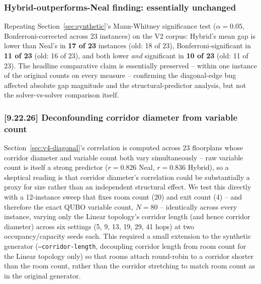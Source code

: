 \documentclass[11pt]{article}
\begin{document}
\subsubsection{Hybrid-outperforms-Neal finding: essentially unchanged}

Repeating Section~\ref{sec:synthetic}'s Mann-Whitney significance test ($\alpha=0.05$, Bonferroni-corrected across 23 instances) on the V2 corpus: Hybrid's mean gap is lower than Neal's in \textbf{17 of 23} instances (old: 18 of 23), Bonferroni-significant in \textbf{11 of 23} (old: 16 of 23), and both lower \emph{and} significant in \textbf{10 of 23} (old: 11 of 23). The headline comparative claim is essentially preserved -- within one instance of the original counts on every measure -- confirming the diagonal-edge bug affected absolute gap magnitude and the structural-predictor analysis, but not the solver-vs-solver comparison itself.

\subsubsection{[9.22.26] Deconfounding corridor diameter from variable count}
\label{sec:dsweep}

Section~\ref{sec:v4-diagonal}'s correlation is computed across 23 floorplans whose corridor diameter and variable count both vary simultaneously -- raw variable count is itself a strong predictor ($r=0.826$ Neal, $r=0.836$ Hybrid), so a skeptical reading is that corridor diameter's correlation could be substantially a proxy for size rather than an independent structural effect. We test this directly with a 12-instance sweep that fixes room count (20) and exit count (4) -- and therefore the exact QUBO variable count, $N=80$ -- identically across every instance, varying only the Linear topology's corridor length (and hence corridor diameter) across six settings (5, 9, 13, 19, 29, 41 hops) at two occupancy/capacity seeds each. This required a small extension to the synthetic generator (\texttt{--corridor-length}, decoupling corridor length from room count for the Linear topology only) so that rooms attach round-robin to a corridor shorter than the room count, rather than the corridor stretching to match room count as in the original generator.
\end{document}
